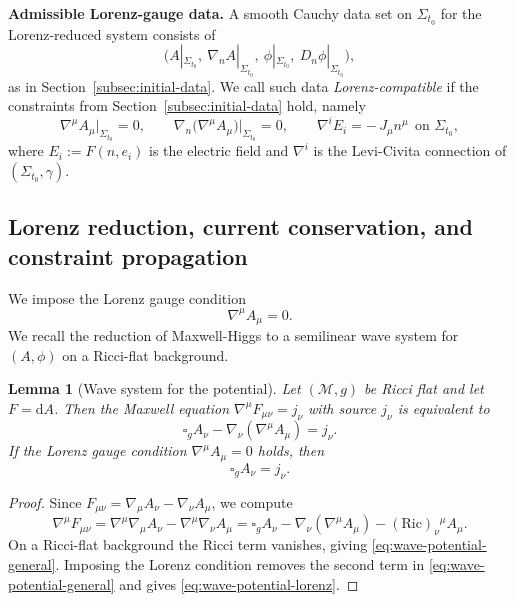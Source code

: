 \documentclass[11pt]{article}
\numberwithin{equation}{section}
\theoremstyle{plain}
\newtheorem{lemma}[theorem]{Lemma}
\theoremstyle{definition}
\theoremstyle{remark}
\newcommand{\dd}{\mathrm{d}}
\begin{document}
\medskip
\noindent\textbf{Admissible Lorenz-gauge data.}
A smooth Cauchy data set on $\Sigma_{t_0}$ for the Lorenz-reduced system consists of
\begin{equation}
\bigl(A|_{\Sigma_{t_0}},\ \nabla_n A|_{\Sigma_{t_0}},\ \phi|_{\Sigma_{t_0}},\ D_n\phi|_{\Sigma_{t_0}}\bigr),
\end{equation}
as in Section~\ref{subsec:initial-data}.
We call such data \emph{Lorenz-compatible} if the constraints from Section~\ref{subsec:initial-data} hold, namely
\begin{equation}
\nabla^\mu A_\mu\big|_{\Sigma_{t_0}}=0,
\qquad
\nabla_n\bigl(\nabla^\mu A_\mu\bigr)\big|_{\Sigma_{t_0}}=0,
\qquad
\nabla^i E_i=-\,J_{\mu}n^{\mu}\ \ \text{on }\Sigma_{t_0},
\end{equation}
where $E_i:=F(n,e_i)$ is the electric field and $\nabla^i$ is the Levi-Civita connection of $(\Sigma_{t_0},\gamma)$.

\subsection{Lorenz reduction, current conservation, and constraint propagation}\label{app:schw-lorenz}

We impose the Lorenz gauge condition
\begin{equation}\label{eq:app-lorenz-schwarzschild}
\nabla^{\mu}A_{\mu}=0.
\end{equation}
We recall the reduction of Maxwell-Higgs to a semilinear wave system for $(A,\phi)$ on a Ricci-flat background.

\begin{lemma}[Wave system for the potential]\label{lem:wave-potential-schwarzschild}
Let $(\mathcal M,g)$ be Ricci flat and let $F=\dd A$.
Then the Maxwell equation $\nabla^\mu F_{\mu\nu}=j_\nu$ with source $j_\nu$ is equivalent to
\begin{equation}\label{eq:wave-potential-general}
\square_g A_\nu-\nabla_\nu(\nabla^\mu A_\mu)=j_\nu.
\end{equation}
If the Lorenz gauge condition $\nabla^\mu A_\mu=0$ holds, then
\begin{equation}\label{eq:wave-potential-lorenz}
\square_g A_\nu=j_\nu.
\end{equation}
\end{lemma}

\begin{proof}
Since $F_{\mu\nu}=\nabla_\mu A_\nu-\nabla_\nu A_\mu$, we compute
\begin{equation}
\nabla^\mu F_{\mu\nu}
=
\nabla^\mu\nabla_\mu A_\nu-\nabla^\mu\nabla_\nu A_\mu
=
\square_g A_\nu-\nabla_\nu(\nabla^\mu A_\mu)-(\mathrm{Ric})_{\nu}{}^{\mu}A_\mu.
\end{equation}
On a Ricci-flat background the Ricci term vanishes, giving \eqref{eq:wave-potential-general}.
Imposing the Lorenz condition removes the second term in \eqref{eq:wave-potential-general} and gives \eqref{eq:wave-potential-lorenz}.
\end{proof}
\end{document}
